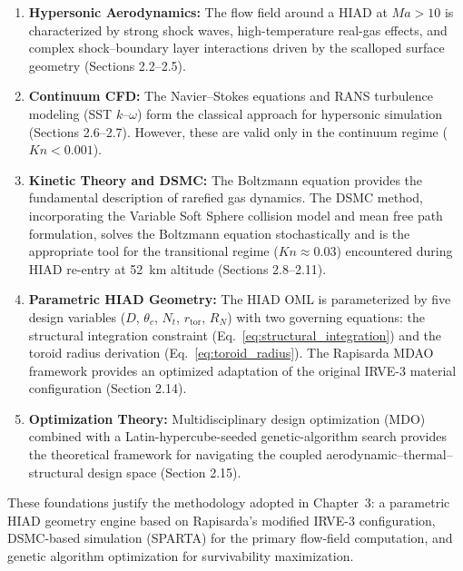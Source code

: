 \begin{enumerate}
    \item \textbf{Hypersonic Aerodynamics:} The flow field around a HIAD at $Ma > 10$ is characterized by strong shock waves, high-temperature real-gas effects, and complex shock--boundary layer interactions driven by the scalloped surface geometry (Sections 2.2--2.5).
    
    \item \textbf{Continuum CFD:} The Navier--Stokes equations and RANS turbulence modeling (SST $k$--$\omega$) form the classical approach for hypersonic simulation (Sections 2.6--2.7). However, these are valid only in the continuum regime ($Kn < 0.001$).
    
    \item \textbf{Kinetic Theory and DSMC:} The Boltzmann equation provides the fundamental description of rarefied gas dynamics. The DSMC method, incorporating the Variable Soft Sphere collision model and mean free path formulation, solves the Boltzmann equation stochastically and is the appropriate tool for the transitional regime ($Kn \approx 0.03$) encountered during HIAD re-entry at 52~km altitude (Sections 2.8--2.11).
    
    \item \textbf{Parametric HIAD Geometry:} The HIAD OML is parameterized by five design variables ($D$, $\theta_c$, $N_t$, $r_{\text{tor}}$, $R_N$) with two governing equations: the structural integration constraint (Eq.~\ref{eq:structural_integration}) and the toroid radius derivation (Eq.~\ref{eq:toroid_radius}). The Rapisarda MDAO framework provides an optimized adaptation of the original IRVE-3 material configuration (Section 2.14).
    
    \item \textbf{Optimization Theory:} Multidisciplinary design optimization (MDO) combined with a Latin-hypercube-seeded genetic-algorithm search provides the theoretical framework for navigating the coupled aerodynamic--thermal--structural design space (Section 2.15).
\end{enumerate}

\noindent These foundations justify the methodology adopted in Chapter~3: a parametric HIAD geometry engine based on Rapisarda's modified IRVE-3 configuration, DSMC-based simulation (SPARTA) for the primary flow-field computation, and genetic algorithm optimization for survivability maximization.
